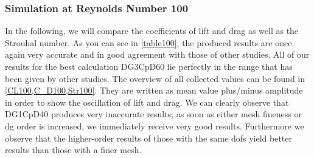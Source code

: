 	\subsubsection{Simulation at Reynolds Number 100}
	In the following, we will compare the coefficients of lift and drag as well as the Strouhal number. As you can see in \cref{table100}, the produced results are once again very accurate and in good agreement with those of other studies. All of our results for the best calculation DG3CpD60 lie perfectly in the range that has been given by other studies.  The overview of all collected values can be found in \cref{CL100,C_D100,Str100}. They are written as mean value plus/minus amplitude in order to show the oscillation of lift and drag. We can clearly observe that DG1CpD40 produces very inaccurate results; as soon as either mesh fineness or \gls{dg} order is increased, we immediately receive very good results. Furthermore we observe that the higher-order results of those with the same \gls{dof}s yield better results than those with a finer mesh.
